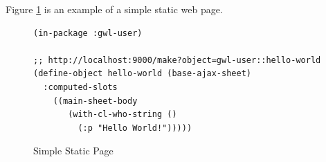 \documentclass [11pt]{book}
\begin{document}
Figure 
\ref{fig:gwl-hello-world} is an example of a simple static web page.
\begin{figure}
\begin{lrbox}{\boxedverb}
\begin{minipage}{\linewidth}
{\small

\begin{verbatim}(in-package :gwl-user)

;; http://localhost:9000/make?object=gwl-user::hello-world
(define-object hello-world (base-ajax-sheet)
  :computed-slots
    ((main-sheet-body
       (with-cl-who-string ()
         (:p "Hello World!")))))

\end{verbatim}}
\end{minipage}
\end{lrbox}
\fbox{\usebox{\boxedverb}}

\caption{Simple Static Page}

\label{fig:gwl-hello-world}

\end{figure}
\end{document}
